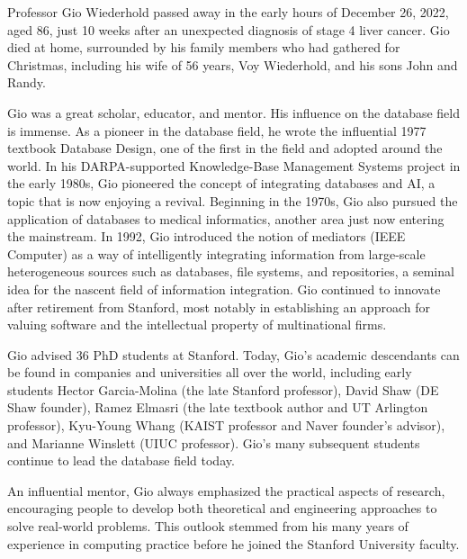 \documentclass[11pt]{article}
\begin{document}
Professor Gio Wiederhold passed away in the early hours of December 26, 2022, aged 86, just 10 weeks after an unexpected diagnosis of stage 4 liver cancer. Gio died at home, surrounded by his family members who had gathered for Christmas, including his wife of 56 years, Voy Wiederhold, and his sons John and Randy.  


Gio was a great scholar, educator, and mentor. His influence on the database field is immense. As a pioneer in the database field, he wrote the influential 1977 textbook Database Design, one of the first in the field and adopted around the world. In his DARPA-supported Knowledge-Base Management Systems project in the early 1980s, Gio pioneered the concept of integrating databases and AI, a topic that is now enjoying a revival. Beginning in the 1970s, Gio also pursued the application of databases to medical informatics, another area just now entering the mainstream. In 1992, Gio introduced the notion of mediators (IEEE Computer) as a way of intelligently integrating information from large-scale heterogeneous sources such as databases, file systems, and repositories, a seminal idea for the nascent field of information integration. Gio continued to innovate after retirement from Stanford, most notably in establishing an approach for valuing software and the intellectual property of multinational firms.


Gio advised 36 PhD students at Stanford. Today, Gio’s academic descendants can be found in companies and universities all over the world, including early students Hector Garcia-Molina (the late Stanford professor), David Shaw (DE Shaw founder), Ramez Elmasri (the late textbook author and UT Arlington professor), Kyu-Young Whang (KAIST professor and Naver founder’s advisor), and Marianne Winslett (UIUC professor). Gio’s many subsequent students continue to lead the database field today. 


An influential mentor, Gio always emphasized the practical aspects of research, encouraging people to develop both theoretical and engineering approaches to solve real-world problems. This outlook stemmed from his many years of experience in computing practice before he joined the Stanford University faculty.
\end{document}
